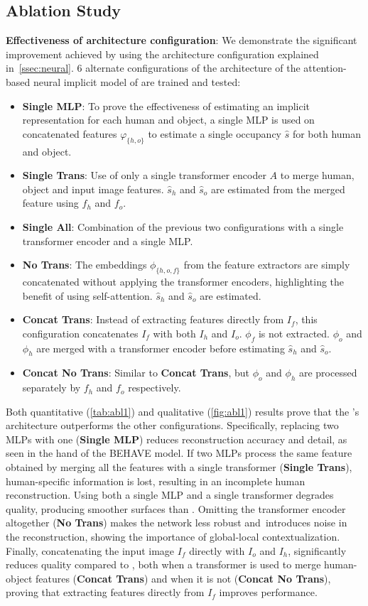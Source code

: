 \subsection{Ablation Study}
\label{ssec:abl}
\vspace{-1mm}
\indent \textbf{Effectiveness of architecture configuration}: We demonstrate the significant improvement achieved by using the architecture configuration  explained in~\cref{ssec:neural}. 6 alternate configurations of the architecture of the  attention-based neural implicit model of \name are trained and tested:
\begin{itemize}[noitemsep]
\item\textbf{Single MLP}: To prove the effectiveness of estimating an implicit representation for each human and object, a single MLP is used on concatenated features $\varphi_{\{h,o\}}$ to estimate a single occupancy $\hat{s}$ for both human and object. 
\item\textbf{Single Trans}: Use of only a single transformer encoder $A$ to merge human, object and input image features. $\hat{s}_h$ and $\hat{s}_o$ are estimated from the merged feature using $f_h$ and $f_o$.
\item\textbf{Single All}: Combination of the previous two configurations with a single transformer encoder and a single MLP.
\item\textbf{No Trans}: The embeddings $\phi_{\{h,o,f\}}$ from the feature extractors are simply concatenated without applying the transformer encoders, highlighting the benefit of using self-attention. $\hat{s}_h$ and $\hat{s}_o$ are estimated.
\item\textbf{Concat Trans}: Instead of extracting features directly from $I_f$, this configuration concatenates  $I_f$ with both $I_h$ and $I_o$. $\phi_f$ is not extracted. $\phi_o$ and $\phi_h$ are merged with a transformer encoder before estimating $\hat{s}_h$ and $\hat{s}_o$.
\item\textbf{Concat No Trans}: Similar to \textbf{Concat Trans}, but  $\phi_o$ and $\phi_h$ are processed separately by  $f_h$ and $f_o$ respectively.
\end{itemize}
Both quantitative (\cref{tab:abl1}) and qualitative (\cref{fig:abl1}) results prove that the \name's architecture outperforms the other configurations. Specifically, replacing two MLPs with one (\textbf{Single MLP}) reduces reconstruction accuracy  and detail, as seen in the hand of the BEHAVE model. 
If two MLPs process the same feature obtained by merging all the features with a single transformer (\textbf{Single Trans}), human-specific information is lost, resulting in an incomplete human reconstruction.  Using both a single MLP and a single transformer degrades quality, producing smoother surfaces than \name. Omitting the transformer encoder altogether (\textbf{No Trans}) makes the network less robust and introduces noise in the reconstruction, showing the importance of global-local contextualization. Finally, concatenating the input image $I_f$ directly with $I_o$ and $I_h$, significantly reduces quality compared to \name, both when a transformer is used to merge human-object features (\textbf{Concat Trans}) and when it is not (\textbf{Concat No Trans}), proving that extracting features directly from $I_f$ improves performance. 

